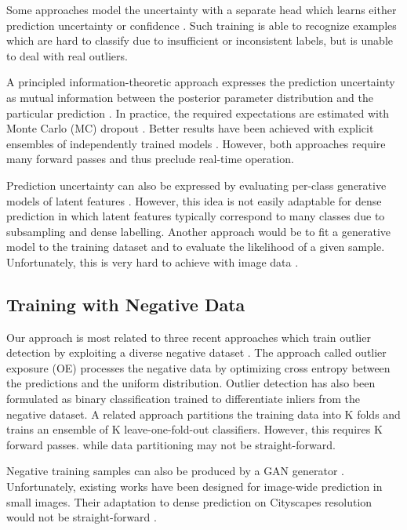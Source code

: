 \documentclass[runningheads]{llncs}
\begin{document}
Some approaches model the uncertainty
with a separate head which learns either
prediction uncertainty 
\cite{kendall17nips,lakshminarayanan17nips} 
or confidence \cite{devries18arxiv}.
Such training is able to recognize examples
which are hard to classify 
due to insufficient or inconsistent labels,
but is unable to deal with real outliers.

A principled information-theoretic approach 
expresses the prediction uncertainty as  
mutual information between 
the posterior parameter distribution
and the particular prediction \cite{smith18uai}.
In practice, the required expectations
are estimated with Monte Carlo (MC) dropout
\cite{kendall17nips}.
Better results 
have been achieved
with explicit ensembles
of independently trained models
\cite{lakshminarayanan17nips}.
However, both approaches 
require many forward passes
and thus preclude real-time operation.

Prediction uncertainty 
can also be expressed
by evaluating per-class 
generative models 
of latent features \cite{Lee2018ASU}.
However, this idea is not easily adaptable 
for dense prediction in 
which latent features 
typically correspond to many classes
due to subsampling and dense labelling.
Another approach would be 
to fit a generative model 
to the training dataset and 
to evaluate the likelihood of a given sample.
Unfortunately, this is very hard
to achieve with image data
\cite{nalisnick19iclr}. 

\subsection{Training with Negative Data}

Our approach is most related 
to three recent approaches 
which train outlier detection 
by exploiting a diverse 
negative dataset \cite{torralba2011}.
The approach called outlier exposure
(OE) \cite{hendrycks19iclr} 
processes the negative data
by optimizing cross entropy 
between the predictions 
and the uniform distribution.
Outlier detection has also been formulated
as binary classification \cite{bevandic2018}
trained to differentiate inliers 
from the negative dataset.
A related approach \cite{Vyas2018OutofDistributionDU} 
partitions the training data into K folds
and trains an ensemble of K
leave-one-fold-out classifiers.
However, this requires K forward passes.
while data partitioning 
may not be straight-forward.

Negative training samples
can also be produced 
by a GAN generator \cite{goodfellow14nips}.
Unfortunately, existing works 
\cite{lee18iclr,sabokrou2018adversarially}
have been designed for 
image-wide prediction in small images.
Their adaptation to dense prediction
on Cityscapes resolution
would not be straight-forward
\cite{brock19iclr}.
\end{document}
